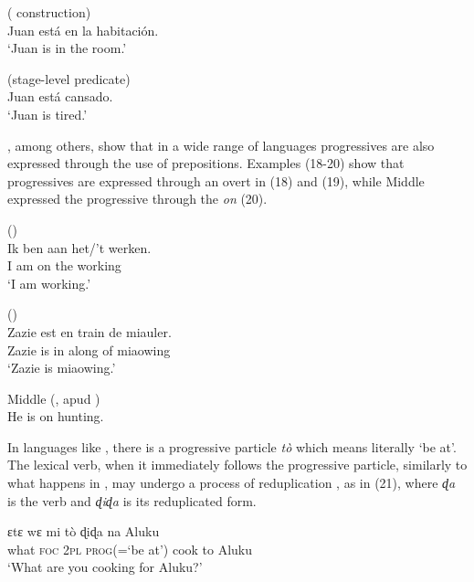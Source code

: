 \documentclass[output=paper]{langsci/langscibook}
\begin{document}
\ea%
          ( construction)\\
        Juan está en la habitación.\\
    \glt ‘Juan is in the room.’
\z

\ea%
    	  (stage-level predicate)\\
        Juan está cansado.\\
    \glt ‘Juan is tired.’
\z

\citet{Mateu1999}, among others, show that in a wide range of languages progressives are also expressed through the use of  prepositions. Examples (18-20) show that progressives are expressed through an overt   in  (18) and  (19), while Middle  expressed the progressive through the  \textit{on} (20).

\ea%
          (\citealt[180-182]{vanGelderen1993})\\
    \gll Ik ben aan het/’t  werken.\\
         I  am  on  the working\\
    \glt ‘I am working.’
\z

\ea%
         (\citealt[8]{Demirdache1997})\\
    \gll Zazie  est en  train   de  miauler.\\
         Zazie  is  in  along   of  miaowing\\
    \glt ‘Zazie is miaowing.'
\z

\ea%
        Middle  (\citealt[168]{Jespersen1949}, apud \citealt[132]{Bybee1994})\\
        He is  on  hunting.
\z

In languages like , there is a progressive particle \textit{tò} which means literally ‘be at’. The lexical verb, when it immediately follows the progressive particle, similarly to what happens in , may undergo a process of reduplication \citep{Aboh2004,Aboh2009}, as in (21), where \textit{ɖa} is the verb and \textit{ɖiɖa} is its reduplicated form.

\ea%
    \label{ex:lorusso:21}
    \gll ɛtɛ   wɛ   mi   tò       ɖiɖa   na  Aluku \\
          what  \textsc{foc} \textsc{2pl} {\textsc{prog}(=‘be at’)}   cook  to  Aluku \\
    \glt ‘What are you cooking for Aluku?’ \citep{Aboh2004} 
\z   
\end{document}
